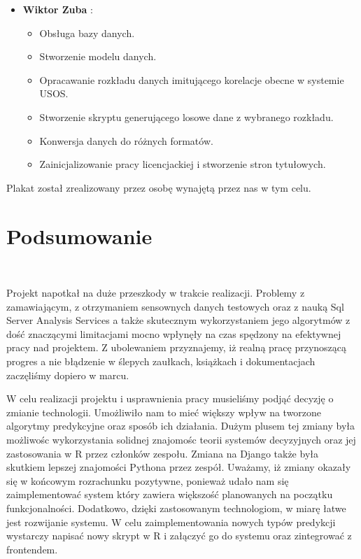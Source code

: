 \documentclass[licencjacka]{pracamgr}
\begin{document}
\begin{itemize}
\begin{itemize}
    \end{itemize}
\item \textbf{Wiktor Zuba} :
  \begin{itemize}
        \item Obsługa bazy danych.
        \item Stworzenie modelu danych.
        \item Opracawanie rozkładu danych imitującego korelacje obecne w systemie USOS.
        \item Stworzenie skryptu generującego losowe dane z wybranego rozkładu.
        \item Konwersja danych do różnych formatów.
        \item Zainicjalizowanie pracy licencjackiej i stworzenie stron tytułowych.
    \end{itemize}
\end{itemize}

Plakat został zrealizowany przez osobę wynajętą przez nas w tym celu.

\chapter{Podsumowanie} ~\\ \indent


Projekt napotkał na duże przeszkody w trakcie realizacji. Problemy z zamawiającym, z otrzymaniem sensownych danych testowych oraz z nauką Sql Server Analysis Services a także skutecznym wykorzystaniem jego algorytmów z dość znaczącymi limitacjami mocno wpłynęły na czas spędzony na efektywnej pracy nad projektem. Z ubolewaniem przyznajemy, iż realną pracę przynoszącą progres a nie błądzenie w ślepych zaułkach, książkach i dokumentacjach zaczęliśmy dopiero w marcu.

W celu realizacji projektu i usprawnienia pracy musieliśmy podjąć decyzję o zmianie technologii. Umożliwiło nam to mieć większy wpływ na tworzone algorytmy predykcyjne oraz sposób ich działania. Dużym plusem tej zmiany była możliwośc wykorzystania solidnej znajomośc teorii systemów decyzyjnych oraz jej zastosowania w R przez członków zespołu. Zmiana na Django także była skutkiem lepszej znajomości Pythona przez zespół. Uważamy, iż zmiany okazały się w końcowym rozrachunku pozytywne, ponieważ udało nam się zaimplementować system który zawiera większość planowanych na początku funkcjonalności. Dodatkowo, dzięki zastosowanym technologiom, w miarę łatwe jest rozwijanie systemu. W celu zaimplementowania nowych typów predykcji wystarczy napisać nowy skrypt w R i załączyć go do systemu oraz zintegrować z frontendem.
\end{document}
